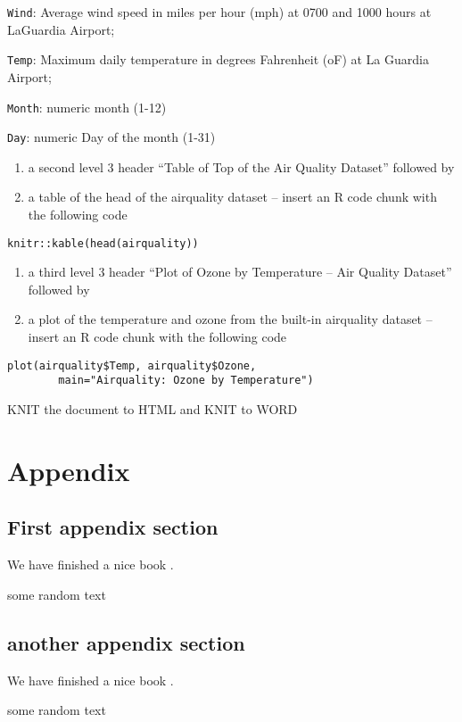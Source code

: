 \documentclass[]{book}
\theoremstyle{definition}
\theoremstyle{definition}
\theoremstyle{definition}
\theoremstyle{remark}
\begin{document}
\texttt{Wind}: Average wind speed in miles per hour (mph) at 0700 and
1000 hours at LaGuardia Airport;

\texttt{Temp}: Maximum daily temperature in degrees Fahrenheit (oF) at
La Guardia Airport;

\texttt{Month}: numeric month (1-12)

\texttt{Day}: numeric Day of the month (1-31)

\begin{enumerate}
\def\labelenumi{\arabic{enumi}.}
\setcounter{enumi}{4}
\item
  a second level 3 header ``Table of Top of the Air Quality Dataset''
  followed by
\item
  a table of the head of the airquality dataset -- insert an R code
  chunk with the following code
\end{enumerate}

\begin{verbatim}
knitr::kable(head(airquality))
\end{verbatim}

\begin{enumerate}
\def\labelenumi{\arabic{enumi}.}
\setcounter{enumi}{6}
\item
  a third level 3 header ``Plot of Ozone by Temperature -- Air Quality
  Dataset'' followed by
\item
  a plot of the temperature and ozone from the built-in airquality
  dataset -- insert an R code chunk with the following code
\end{enumerate}

\begin{verbatim}
plot(airquality$Temp, airquality$Ozone, 
        main="Airquality: Ozone by Temperature")
\end{verbatim}

KNIT the document to HTML and KNIT to WORD

\part{Appendix}\label{part-appendix}

\appendix


\chapter{First appendix section}\label{first-appendix-section}

We have finished a nice book .

some random  text

\chapter{another appendix section}\label{another-appendix-section}

We have finished a nice book .

some random  text



\printindex
\end{document}
